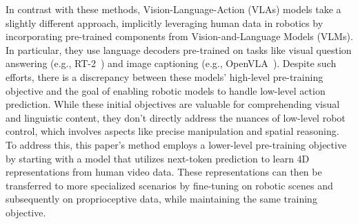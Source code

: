 









In contrast with these methods, Vision-Language-Action (VLAs) models take a slightly different approach, implicitly leveraging human data in robotics by incorporating pre-trained components from Vision-and-Language Models (VLMs). In particular, they use language decoders pre-trained on tasks like visual question answering (e.g., RT-2~\cite{brohan_rt-2_2023}) and image captioning (e.g., OpenVLA~\cite{kimOpenVLAOpenSourceVisionLanguageAction2024}). Despite such efforts, there is a discrepancy between these models' high-level pre-training objective and the goal of enabling robotic models to handle low-level action prediction. While these initial objectives are valuable for comprehending visual and linguistic content, they don't directly address the nuances of low-level robot control, which involves aspects like precise manipulation and spatial reasoning. To address this, this paper's method employs a lower-level pre-training objective by starting with a model that utilizes next-token prediction to learn 4D representations from human video data. These representations can then be transferred to more specialized scenarios by fine-tuning on robotic scenes and subsequently on proprioceptive data, while maintaining the same training objective.







